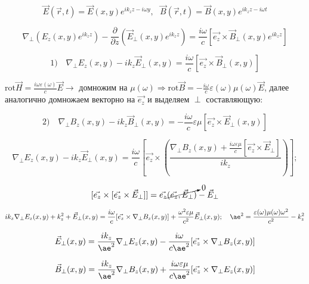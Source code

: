 \documentclass[12pt, a4paper]{report}
\begin{document}
\fi


\[ \vec{E } (\vec{r } ,t ) = \vec{E } (x, y ) e^{ i k_z z - i \omega y }, \text{ } \vec{B } (\vec{r } , t )= \vec{B } (x,y) e^{  i k_z z - i \omega t}    \] 

\[ \nabla_{ \perp  } (E_z (x,y ) e^{ i k_z z })   - \frac{\partial}{\partial  z } (\vec{E } _{ \perp } (x,y ) e^{ i k_z z }) =  \frac{ i \omega}{c }[ \vec{e_z} \times  \vec{B} _{ \perp } (x,y ) e^{ i k_z z}  ]   \] 

\[ 1)\quad  \nabla_{ \perp } E_z (x, y ) - i k_z \vec{E } _{\perp  } (x,y   ) = \frac{ i \omega }{c } [ \vec{e_z} \times  \vec{B} _{ \perp } (x,y ) ]   \] 

\( \displaystyle \mathrm{rot } \vec{H } = \frac{i \omega \varepsilon (\omega)}{c } \vec{E}  \to  \)  домножим на \( \displaystyle \mu (\omega)  \Rightarrow \mathrm{rot } \vec{B } = - \frac{i \omega }{c } \varepsilon (\omega ) \mu (\omega) \vec{E }   \), далее аналогично домножаем векторно на \( \vec{e_z}  \)  и выделяем \( \perp  \) составляющую: 

\[ 2) \quad \nabla_{ \perp } B_z (x,y ) - i k_z \vec{B } _{\perp } (x,y ) = - \frac{i \omega }{c } \varepsilon \mu [\vec{e_z} \times  \vec{E} _{ \perp } (x,y ) ]   \] 

\[ \nabla_{ \perp } E_z (x,y ) - i k_z \vec{E }_{\perp  }(x,y ) = \frac{i \omega }{c } \left[ \vec{e_z} \times \left( \frac{\nabla_{ \perp } B_z (x,y )  + \frac{i \omega \varepsilon \mu}{c } [\vec{e_z} \times  \vec{E} _{ \perp }]  }  {i k_z}  \right) \right] ;     \] 

\[ [\vec{e_z }\times [\vec{e_z }\times  \vec{E } _{\perp  }  ]  ] = \vec{e_z } \cancelto{0}{(\vec{e_z }, \vec{E }_{\perp  }   )} - \vec{E } _{ \perp }  \] 

\[ i k_z \nabla_{ \perp  } E_z (x,y ) + k_z ^2 + \vec{E } _{\perp  } (x,y ) = \frac{ i \omega }{c } [ \vec{e_z } \times \nabla_{ \perp  } B_z (x,y )  ] + \frac{ \omega ^2 \varepsilon \mu }{c ^2 }  \vec{E }_{ \perp }     ( x,y ) ; \quad \ae ^2 = \frac{ \varepsilon (\omega )\mu (\omega ) \omega ^2 }{c ^2 }   - k_z ^2   \] 

\[ \vec{E } _{\perp  } (x,y) = \frac{i k_z }{ \ae ^2 } \nabla_{ \perp } E_z (x,y ) - \frac{ i \omega }{c \ae ^2  } [ \vec{e_z  } \times  \nabla_{ \perp } B_z (x,y ) ]     \] 

\[ \vec{B } _{\perp } (x,y )= \frac{i k_z }{ \ae ^2 } \nabla_{ \perp } B_z (x,y ) + \frac{ i \omega \varepsilon \mu }{c \ae ^2  } [ \vec{e_z  } \times  \nabla_{ \perp } E_z (x,y ) ]     \] 
\end{document}
